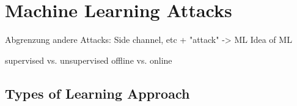 
\section{Machine Learning Attacks}



Abgrenzung andere Attacks: Side channel, etc + "attack" -> ML
Idea of ML

supervised vs. unsupervised
offline vs. online


\subsection{Types of Learning Approach}


